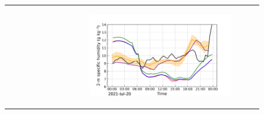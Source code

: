 \begin{figure}[hbtp]
\begin{tabular}{cc}
\begin{subfigure}[t]{0.5\textwidth}
        \end{subfigure} &
        \begin{subfigure}[t]{0.5\textwidth}
            \caption{}
            \includegraphics[width=\textwidth]{images/chap5/IOP_TS/TS_2021-07-20_elsplans_q2m.png}
        \end{subfigure} \\


\end{tabular}
\end{figure}
